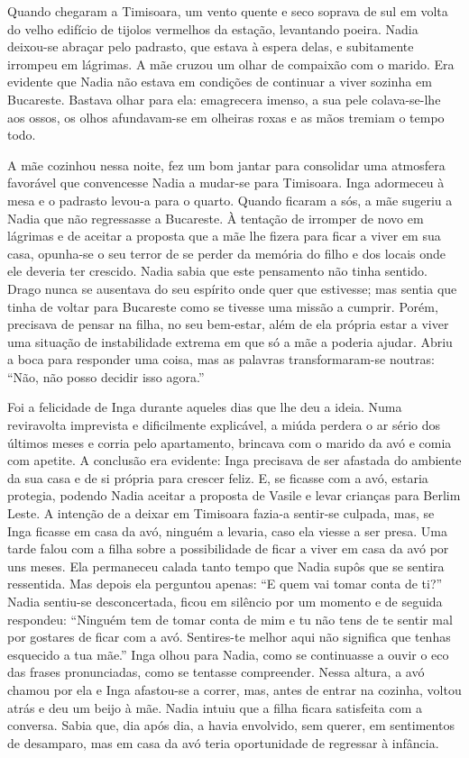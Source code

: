 Quando chegaram a Timisoara, um vento quente e seco soprava de sul em
volta do velho edifício de tijolos vermelhos da estação, levantando
poeira. Nadia deixou-se abraçar pelo padrasto, que estava à espera
delas, e subitamente irrompeu em lágrimas. A mãe cruzou um olhar de compaixão com o marido. Era evidente que Nadia não estava em condições de
continuar a viver sozinha em Bucareste. Bastava olhar para ela:
emagrecera imenso, a sua pele colava-se-lhe aos ossos, os olhos
afundavam-se em olheiras roxas e as mãos tremiam o tempo todo.

A mãe cozinhou nessa noite, fez um bom jantar para consolidar uma
atmosfera favorável que convencesse Nadia a mudar-se para Timisoara.
Inga adormeceu à mesa e o padrasto levou-a para o quarto. Quando ficaram
a sós, a mãe sugeriu a Nadia que não regressasse a Bucareste. À tentação de irromper de novo em lágrimas e de aceitar a proposta que a
mãe lhe fizera para ficar a viver em sua casa, opunha-se o seu terror de
se perder da memória do filho e dos locais onde ele deveria ter
crescido. Nadia sabia que este pensamento não tinha sentido. Drago nunca
se ausentava do seu espírito onde quer que estivesse; mas sentia que
tinha de voltar para Bucareste como se tivesse uma missão a cumprir.
Porém, precisava de pensar na filha, no seu bem-estar, além de ela
própria estar a viver uma situação de instabilidade extrema em que só a
mãe a poderia ajudar. Abriu a boca para responder uma coisa, mas as
palavras transformaram-se noutras: ``Não, não posso decidir isso
agora.''

Foi a felicidade de Inga durante aqueles dias que lhe deu a ideia. Numa
reviravolta imprevista e dificilmente explicável, a miúda perdera o ar
sério dos últimos meses e corria pelo apartamento, brincava com o marido
da avó e comia com apetite. A conclusão era evidente: Inga precisava
de ser afastada do ambiente da sua casa e de si própria para crescer
feliz. E, se ficasse com a avó, estaria protegia, podendo Nadia aceitar
a proposta de Vasile e levar crianças para Berlim Leste. A intenção de a
deixar em Timisoara fazia-a sentir-se culpada, mas, se Inga ficasse em
casa da avó, ninguém a levaria, caso ela viesse a ser presa. Uma tarde
falou com a filha sobre a possibilidade de ficar a viver em casa da avó
por uns meses. Ela permaneceu calada tanto tempo que Nadia supôs que se
sentira ressentida. Mas depois ela perguntou apenas: ``E quem vai tomar
conta de ti?'' Nadia sentiu-se desconcertada, ficou em silêncio por um
momento e de seguida respondeu: ``Ninguém tem de tomar conta de mim e
tu não tens de te sentir mal por gostares de ficar com a avó.
Sentires-te melhor aqui não significa que tenhas esquecido a tua mãe.''
Inga olhou para Nadia, como se continuasse a ouvir o eco das frases
pronunciadas, como se tentasse compreender. Nessa altura, a avó chamou
por ela e Inga afastou-se a correr, mas, antes de entrar na cozinha,
voltou atrás e deu um beijo à mãe. Nadia intuiu que a filha ficara
satisfeita com a conversa. Sabia que, dia após dia, a havia envolvido,
sem querer, em sentimentos de desamparo, mas em casa da avó
teria oportunidade de regressar à infância.

